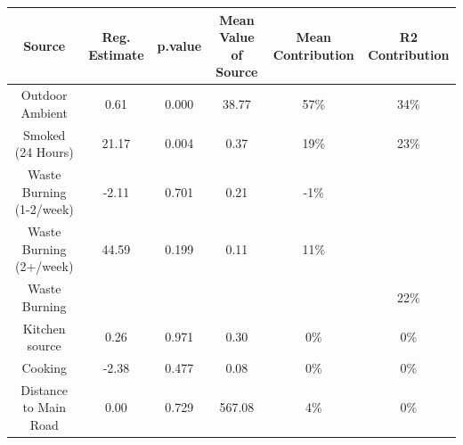 \begin{table}
\centering
\begin{tabular}{cccccc}
\toprule
Source & Reg. Estimate & p.value & Mean Value of Source & Mean Contribution & R2 Contribution\\
\midrule
Outdoor Ambient & 0.61 & 0.000 & 38.77 & 57\% & 34\%\\
Smoked (24 Hours) & 21.17 & 0.004 & 0.37 & 19\% & 23\%\\
Waste Burning (1-2/week) & -2.11 & 0.701 & 0.21 & -1\% & \\
Waste Burning (2+/week) & 44.59 & 0.199 & 0.11 & 11\% & \\
Waste Burning &  &  &  &  & 22\%\\
\addlinespace
Kitchen source & 0.26 & 0.971 & 0.30 & 0\% & 0\%\\
Cooking & -2.38 & 0.477 & 0.08 & 0\% & 0\%\\
Distance to Main Road & 0.00 & 0.729 & 567.08 & 4\% & 0\%\\
\bottomrule
\end{tabular}
\end{table}
